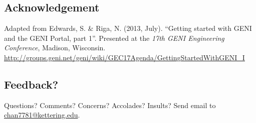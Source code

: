 \documentclass[12pt,letterpaper]{article}
\begin{document}
\subsection*{Acknowledgement}

Adapted from Edwards, S. \& Riga, N. (2013, July).
``Getting started with GENI and the GENI Portal, part 1''.
Presented at the \emph{17th GENI Engineering Conference}, Madison, Wisconsin.
\url{http://groups.geni.net/geni/wiki/GEC17Agenda/GettingStartedWithGENI_I}

\subsection*{Feedback?}
Questions? Comments? Concerns? Accolades? Insults? Send email to \url{chan7781@kettering.edu}.
\end{document}
